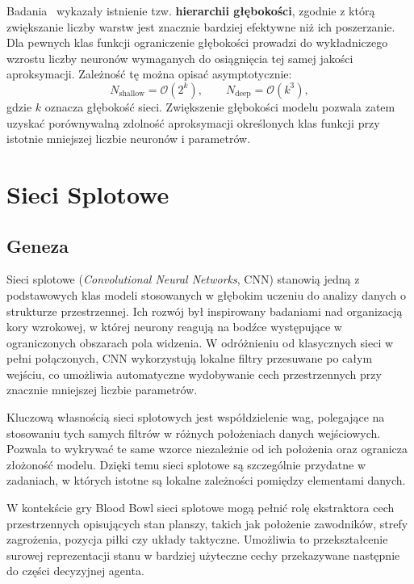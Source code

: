 Badania~\cite{RolnickTegmark2017, telgarsky2016benefits, H.N.Mhaskar2020} wykazały istnienie tzw. \textbf{hierarchii głębokości}, zgodnie z którą zwiększanie liczby warstw jest znacznie bardziej efektywne niż ich poszerzanie. Dla pewnych klas funkcji ograniczenie głębokości prowadzi do wykładniczego wzrostu liczby neuronów wymaganych do osiągnięcia tej samej jakości aproksymacji. Zależność tę można opisać asymptotycznie:
\begin{equation}
	N_{\text{shallow}} = \mathcal{O}\!\left(2^{k}\right), \qquad
	N_{\text{deep}} = \mathcal{O}\!\left(k^{3}\right),
	\label{eq:depth-hierarchy}
\end{equation}
gdzie $k$ oznacza głębokość sieci. Zwiększenie głębokości modelu pozwala zatem uzyskać porównywalną zdolność aproksymacji określonych klas funkcji przy istotnie mniejszej liczbie neuronów i parametrów.




\section{Sieci Splotowe}
\subsection{Geneza}
Sieci splotowe (\textit{Convolutional Neural Networks}, CNN) stanowią jedną z podstawowych klas modeli stosowanych w głębokim uczeniu do analizy danych o strukturze przestrzennej. Ich rozwój był inspirowany badaniami nad organizacją kory wzrokowej, w której neurony reagują na bodźce występujące w ograniczonych obszarach pola widzenia. W odróżnieniu od klasycznych sieci w pełni połączonych, CNN wykorzystują lokalne filtry przesuwane po całym wejściu, co umożliwia automatyczne wydobywanie cech przestrzennych przy znacznie mniejszej liczbie parametrów.

Kluczową własnością sieci splotowych jest współdzielenie wag, polegające na stosowaniu tych samych filtrów w różnych położeniach danych wejściowych. Pozwala to wykrywać te same wzorce niezależnie od ich położenia oraz ogranicza złożoność modelu. Dzięki temu sieci splotowe są szczególnie przydatne w zadaniach, w których istotne są lokalne zależności pomiędzy elementami danych.

W kontekście gry Blood Bowl sieci splotowe mogą pełnić rolę ekstraktora cech przestrzennych opisujących stan planszy, takich jak położenie zawodników, strefy zagrożenia, pozycja piłki czy układy taktyczne. Umożliwia to przekształcenie surowej reprezentacji stanu w bardziej użyteczne cechy przekazywane następnie do części decyzyjnej agenta. \cite{lecun1998gradient}


